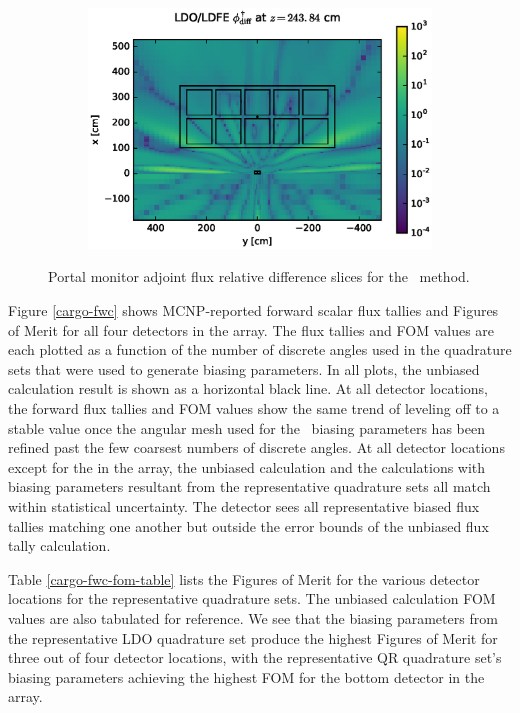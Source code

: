 \begin{figure}[!htb]
\ContinuedFloat
\begin{subfigure}{\textwidth}
\centering
\includegraphics[max height=0.445\textheight]
{img/cargo-plots/fwc-adj/flux-diff-rel-ldfe01.eps}
\end{subfigure}
\caption{Portal monitor adjoint flux relative difference slices for the \fwc\ method.}
\label{cargo-fwc-adj-diff-rel}
\end{figure}

\clearpage
Figure \ref{cargo-fwc} shows MCNP-reported forward scalar flux tallies and Figures of Merit for
all four detectors in the array. The flux tallies and FOM values are each plotted as a function
of the number of discrete angles used in the quadrature sets that were used to generate biasing
parameters. In all plots, the unbiased calculation result is shown as a horizontal black line.
At all detector locations, the forward flux tallies and FOM values show the same trend of 
leveling off to a stable value once the angular mesh used for the \fwc\ biasing parameters has
been refined past the few coarsest numbers of discrete angles. At all detector locations except
for the  in the array, the unbiased calculation and the calculations with biasing 
parameters resultant from the representative quadrature sets all match within
statistical uncertainty. The  detector sees all representative biased flux tallies
matching one another but outside the error bounds of the unbiased flux tally calculation.

Table \ref{cargo-fwc-fom-table} lists the Figures of Merit for the various detector locations for
the representative quadrature sets. The unbiased calculation FOM values are also tabulated for
reference. We see that the biasing parameters from the representative LDO quadrature set produce
the highest Figures of Merit for three out of four detector locations, with the representative 
QR quadrature set's biasing parameters achieving the highest FOM for the bottom detector in the
array.

